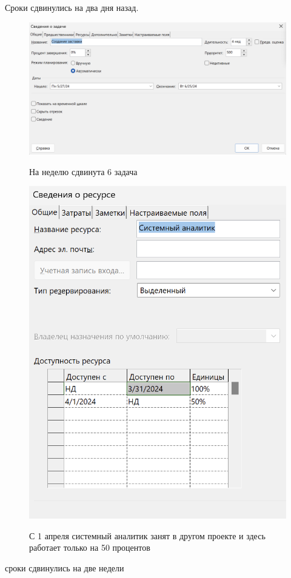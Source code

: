Сроки сдвинулись на два дня назад.

\begin{figure}[ht!]
	\includegraphics[width=0.75\linewidth]{assets/images/Screenshot 2024-03-09 at 11.30.35.png}
	\label{fig:r2}
	\caption{На неделю сдвинута 6 задача}
\end{figure}
\FloatBarrier

\begin{figure}[ht!]
	\includegraphics[width=0.75\linewidth]{assets/images/Screenshot 2024-03-09 at 11.31.44.png}
	\label{fig:r2}
	\caption{С 1 апреля системный аналитик занят в другом проекте и здесь работает только на 50 процентов}
\end{figure}
\FloatBarrier

сроки сдвинулись на две недели

